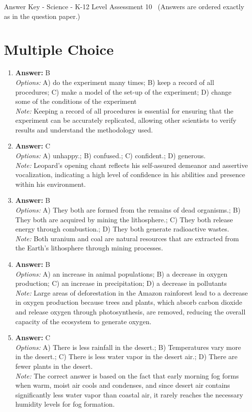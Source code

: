 \documentclass[12pt]{article}
\begin{document}
\begin{center}
Answer Key - Science - K-12 Level Assessment 10 \
\small (Answers are ordered exactly as in the question paper.)
\end{center}

\section*{Multiple Choice}
\begin{enumerate}[label=\arabic*.]
\item \textbf{Answer:} B
\\ \textit{Options:} A) do the experiment many times; B) keep a record of all procedures; C) make a model of the set-up of the experiment; D) change some of the conditions of the experiment
\\ \textit{Note:} Keeping a record of all procedures is essential for ensuring that the experiment can be accurately replicated, allowing other scientists to verify results and understand the methodology used.
\item \textbf{Answer:} C
\\ \textit{Options:} A) unhappy.; B) confused.; C) confident.; D) generous.
\\ \textit{Note:} Leopard's opening chant reflects his self-assured demeanor and assertive vocalization, indicating a high level of confidence in his abilities and presence within his environment.
\item \textbf{Answer:} B
\\ \textit{Options:} A) They both are formed from the remains of dead organisms.; B) They both are acquired by mining the lithosphere.; C) They both release energy through combustion.; D) They both generate radioactive wastes.
\\ \textit{Note:} Both uranium and coal are natural resources that are extracted from the Earth's lithosphere through mining processes.
\item \textbf{Answer:} B
\\ \textit{Options:} A) an increase in animal populations; B) a decrease in oxygen production; C) an increase in precipitation; D) a decrease in pollutants
\\ \textit{Note:} Large areas of deforestation in the Amazon rainforest lead to a decrease in oxygen production because trees and plants, which absorb carbon dioxide and release oxygen through photosynthesis, are removed, reducing the overall capacity of the ecosystem to generate oxygen.
\item \textbf{Answer:} C
\\ \textit{Options:} A) There is less rainfall in the desert.; B) Temperatures vary more in the desert.; C) There is less water vapor in the desert air.; D) There are fewer plants in the desert.
\\ \textit{Note:} The correct answer is based on the fact that early morning fog forms when warm, moist air cools and condenses, and since desert air contains significantly less water vapor than coastal air, it rarely reaches the necessary humidity levels for fog formation.
\end{enumerate}
\end{document}
